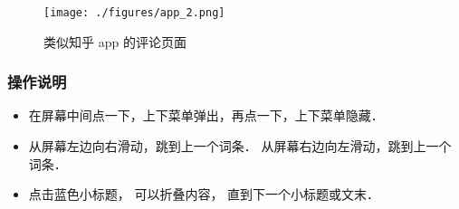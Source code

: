 \begin{figure}[ht]
\centering
\texttt{[image: ./figures/app\_2.png]}
\caption{类似知乎 app 的评论页面} \label{app_fig2}
\end{figure}

\subsubsection{操作说明}
\begin{itemize}
\item 在屏幕中间点一下，上下菜单弹出，再点一下，上下菜单隐藏．
\item 从屏幕左边向右滑动，跳到上一个词条． 从屏幕右边向左滑动，跳到上一个词条．
\item 点击蓝色小标题， 可以折叠内容， 直到下一个小标题或文末．
\end{itemize}
